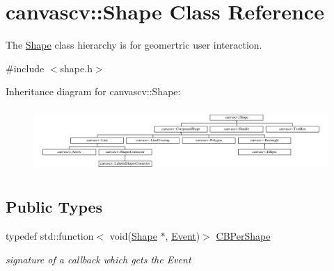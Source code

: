 \hypertarget{classcanvascv_1_1Shape}{}\section{canvascv\+:\+:Shape Class Reference}
\label{classcanvascv_1_1Shape}


The \hyperlink{classcanvascv_1_1Shape}{Shape} class hierarchy is for geomertric user interaction.  




{\ttfamily \#include $<$shape.\+h$>$}

Inheritance diagram for canvascv\+:\+:Shape\+:\begin{figure}[H]
\begin{center}
\leavevmode
\includegraphics[height=2.466960cm]{classcanvascv_1_1Shape}
\end{center}
\end{figure}
\subsection*{Public Types}
\begin{DoxyCompactItemize}
\item 
typedef std\+::function$<$ void(\hyperlink{classcanvascv_1_1Shape}{Shape} $\ast$, \hyperlink{classcanvascv_1_1Shape_a3fa381d7be3c6bb3cd736e237a444d5c}{Event})$>$ \hyperlink{classcanvascv_1_1Shape_ab36440a99a65779c9b3270dc83625b9b}{C\+B\+Per\+Shape}\hypertarget{classcanvascv_1_1Shape_ab36440a99a65779c9b3270dc83625b9b}{}\label{classcanvascv_1_1Shape_ab36440a99a65779c9b3270dc83625b9b}

\begin{DoxyCompactList}\small\item\em signature of a callback which gets the Event \end{DoxyCompactList}\end{DoxyCompactItemize}
